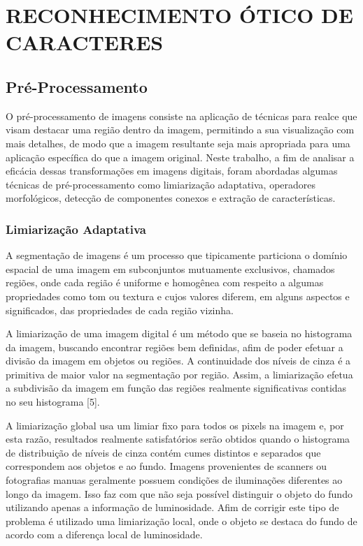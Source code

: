 \documentclass[letterpaper, 10 pt, conference]{ieeeconf}  %
\begin{document}
\section{RECONHECIMENTO ÓTICO DE CARACTERES}

\subsection{Pré-Processamento}

O pré-processamento de imagens consiste na aplicação de técnicas para realce
que visam destacar uma região dentro da imagem, permitindo a
sua visualização com mais detalhes, de modo que a imagem resultante seja mais
apropriada para uma aplicação específica do que a imagem original. Neste trabalho,
a fim de analisar a eficácia dessas transformações em imagens digitais,
foram abordadas algumas técnicas de pré-processamento como limiarização
adaptativa, operadores morfológicos, detecção de componentes conexos e extração
de características.\\

\subsubsection{Limiarização Adaptativa}

A segmentação de imagens é um processo que tipicamente particiona o domínio
espacial de uma imagem em subconjuntos mutuamente exclusivos, chamados regiões,
onde cada região é uniforme e homogênea com respeito a algumas propriedades como
tom ou textura e cujos valores diferem, em alguns aspectos e significados, das
propriedades de cada região vizinha.

A limiarização de uma imagem digital é um método que se baseia no histograma da
imagem, buscando encontrar regiões bem definidas, afim de poder efetuar a
divisão da imagem em objetos ou regiões. A continuidade dos níveis de cinza é a
primitiva de maior valor na segmentação por região. Assim, a limiarização efetua
a subdivisão da imagem em função das regiões realmente significativas contidas
no seu histograma [5].

A limiarização global usa um limiar fixo para todos os pixels na imagem e, por
esta razão, resultados realmente satisfatórios serão obtidos quando o histograma
de distribuição de níveis de cinza contém cumes distintos e separados que
correspondem aos objetos e ao fundo.
Imagens provenientes de scanners ou fotografias manuas geralmente possuem
condições de iluminações diferentes ao longo da imagem. Isso faz com que não
seja possível distinguir o objeto do fundo utilizando apenas a informação de
luminosidade. Afim de corrigir este tipo de problema é utilizado uma
limiarização local, onde o objeto se destaca do fundo de acordo com a diferença
local de luminosidade.
\end{document}
